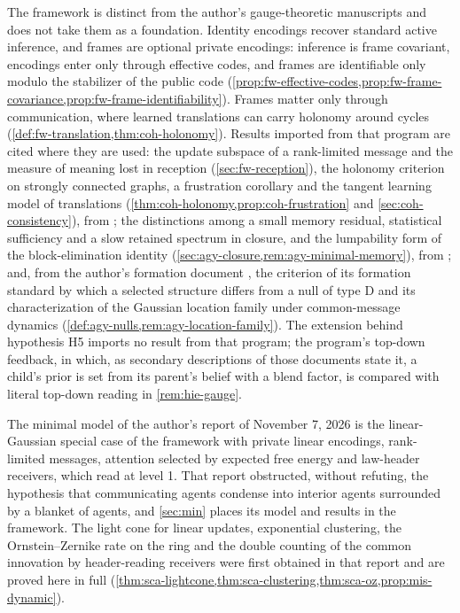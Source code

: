The framework is distinct from the author's gauge-theoretic manuscripts \citep{dennis2026magent,dennis2026participatory} and does not take them as a foundation. Identity encodings recover standard active inference, and frames are optional private encodings: inference is frame covariant, encodings enter only through effective codes, and frames are identifiable only modulo the stabilizer of the public code (\cref{prop:fw-effective-codes,prop:fw-frame-covariance,prop:fw-frame-identifiability}). Frames matter only through communication, where learned translations can carry holonomy around cycles (\cref{def:fw-translation,thm:coh-holonomy}). Results imported from that program are cited where they are used: the update subspace of a rank-limited message and the measure of meaning lost in reception (\cref{sec:fw-reception}), the holonomy criterion on strongly connected graphs, a frustration corollary and the tangent learning model of translations (\cref{thm:coh-holonomy,prop:coh-frustration} and \cref{sec:coh-consistency}), from \citet{dennis2026magent}; the distinctions among a small memory residual, statistical sufficiency and a slow retained spectrum in closure, and the lumpability form of the block-elimination identity (\cref{sec:agy-closure,rem:agy-minimal-memory}), from \citet{dennis2026participatory}; and, from the author's formation document \citep{dennis2026formation}, the criterion of its formation standard by which a selected structure differs from a null of type D and its characterization of the Gaussian location family under common-message dynamics (\cref{def:agy-nulls,rem:agy-location-family}). The extension behind hypothesis H5 imports no result from that program; the program's top-down feedback, in which, as secondary descriptions of those documents state it, a child's prior is set from its parent's belief with a blend factor, is compared with literal top-down reading in \cref{rem:hie-gauge}.

The minimal model of the author's report of November 7, 2026 \citep{dennis2026communicating} is the linear-Gaussian special case of the framework with private linear encodings, rank-limited messages, attention selected by expected free energy and law-header receivers, which read at level 1. That report obstructed, without refuting, the hypothesis that communicating agents condense into interior agents surrounded by a blanket of agents, and \cref{sec:min} places its model and results in the framework. The light cone for linear updates, exponential clustering, the Ornstein--Zernike rate on the ring and the double counting of the common innovation by header-reading receivers were first obtained in that report and are proved here in full (\cref{thm:sca-lightcone,thm:sca-clustering,thm:sca-oz,prop:mis-dynamic}).
